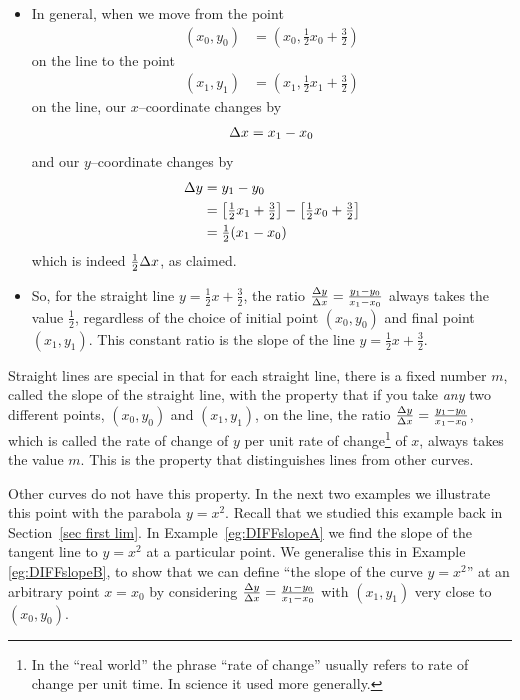 \begin{eg}
\begin{itemize}
\item In general, when we move from the point
\begin{align*}
(x_0,y_0) &= (x_0, \tfrac{1}{2}x_0+\tfrac{3}{2})
\end{align*}
on the line to the point
\begin{align*}
(x_1,y_1) &= (x_1, \tfrac{1}{2}x_1+\tfrac{3}{2})
\end{align*}
on the line, our $x$--coordinate changes by
\begin{align*}
\Delta x=x_1-x_0
\end{align*}
and our $y$--coordinate changes by
\begin{align*}
\Delta y&=y_1-y_0 \\
&=\big[\tfrac{1}{2}x_1+\tfrac{3}{2}\big]
-\big[\tfrac{1}{2}x_0+\tfrac{3}{2}\big] \\
&=\tfrac{1}{2}(x_1-x_0)
\end{align*}
which is indeed $\tfrac{1}{2}\Delta x$, as claimed.

\item So, for the straight line $y=\tfrac{1}{2}x+\tfrac{3}{2}$, the ratio $\tfrac{\Delta
y}{\Delta x} =\tfrac{y_1-y_0}{x_1-x_0}$ always takes the value $\frac{1}{2}$,
regardless of the choice of initial point $(x_0,y_0)$ and final point
$(x_1,y_1)$. This constant ratio is the slope of the line $y=\tfrac{1}{2}x+\tfrac{3}{2}$.
\end{itemize}
\end{eg}

Straight lines are special in that for each straight line, there is a fixed number
$m$, called the slope of the straight line, with the property that if you
take \emph{any} two different points, $(x_0,y_0)$ and $(x_1,y_1)$, on the line,
the ratio  $\tfrac{\Delta y}{\Delta x}=\tfrac{y_1-y_0}{x_1-x_0}$,
which is called the rate of change of $y$ per unit rate of
change\footnote{In the ``real world'' the phrase ``rate of change'' usually
refers to rate of change per unit time. In science it used more generally.}
of $x$, always takes the value $m$. This is the property that distinguishes
lines from other curves.

Other curves do not have this property. In the next two examples we illustrate this
point with the parabola $y=x^2$. Recall that we studied this example back in
Section~\ref{sec first lim}. In Example~\ref{eg:DIFFslopeA} we find the slope of the
tangent line to $y=x^2$ at a particular point. We generalise this in Example
\ref{eg:DIFFslopeB}, to show that we can define ``the slope of the curve $y=x^2$'' at an
arbitrary point $x=x_0$ by  considering $\tfrac{\Delta y}{\Delta x}=\tfrac{y_1-y_0}{x_1-x_0}$
with $(x_1,y_1)$ very close to $(x_0,y_0)$.


